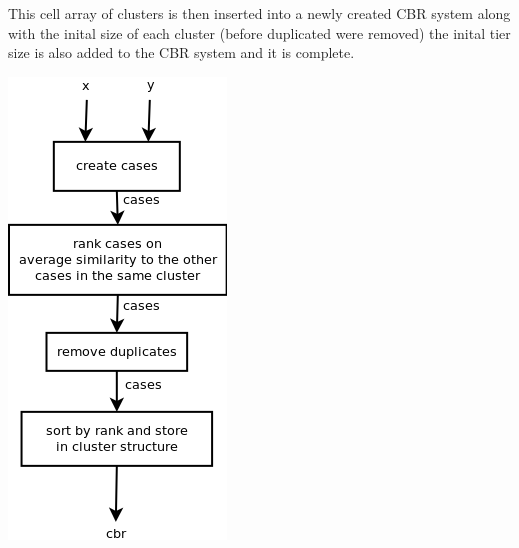 \documentclass[11pt]{article}
\begin{document}
\begin{itemize}
\begin{itemize}
This cell array of clusters is then inserted into a newly created CBR system along with the inital size of each cluster (before duplicated were removed) the inital tier size is also added to the CBR system and it is complete.

\includegraphics[width=\linewidth]{init.png}

\end{itemize}
\end{itemize}
\end{document}
